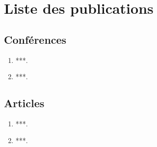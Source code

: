  \chapter{Liste des publications}\label{app-C}

 \section{Conférences}

 \begin{enumerate}
 \item ***.
 \item ***.
 \end{enumerate}

 \section{Articles}

 \begin{enumerate}
 \item ***.
 \item ***.
 \end{enumerate} 